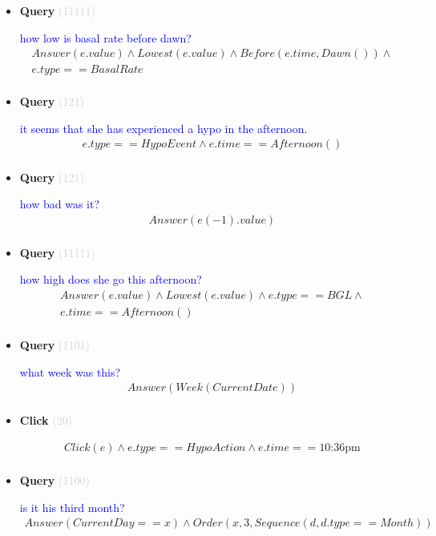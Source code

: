 \documentclass[11pt]{article}
\newcommand{\key}[1]{\textcolor{lightgray}{#1}}
\newcounter{CQuery}
\newcounter{CClick}
\begin{document}
\begin{itemize}
\item
\textbf{Query\theCQuery} \key{(11111)} \addtocounter{CQuery}{1}
\textcolor{blue}{ how low is basal rate before dawn? }
\begin{multline*}
Answer(e.value) \wedge Lowest(e.value) \wedge Before(e.time, Dawn()) \wedge \\ 
e.type==BasalRate \\ 
\end{multline*}


\item
\textbf{Query\theCQuery} \key{(121)} \addtocounter{CQuery}{1}
\textcolor{blue}{ it seems that she has experienced a hypo in the afternoon. }
\begin{multline*}
e.type==HypoEvent \wedge e.time==Afternoon() \\ 
\end{multline*}


\item
\textbf{Query\theCQuery} \key{(121)} \addtocounter{CQuery}{1}
\textcolor{blue}{ how bad was it? }
\begin{multline*}
Answer(e(-1).value) \\ 
\end{multline*}


\item
\textbf{Query\theCQuery} \key{(11111)} \addtocounter{CQuery}{1}
\textcolor{blue}{ how high does she go this afternoon? }
\begin{multline*}
Answer(e.value) \wedge Lowest(e.value) \wedge e.type==BGL \wedge \\ 
e.time==Afternoon() \\ 
\end{multline*}


\item
\textbf{Query\theCQuery} \key{(1101)} \addtocounter{CQuery}{1}
\textcolor{blue}{ what week was this? }
\begin{multline*}
Answer(Week(CurrentDate)) \\ 
\end{multline*}


\item
\textbf{Click\theCClick} \key{(20)} \addtocounter{CClick}{1}
\textcolor{blue}{  }
\begin{multline*}
Click(e) \wedge e.type==HypoAction \wedge e.time==\mbox{10:36pm} \\ 
\end{multline*}


\item
\textbf{Query\theCQuery} \key{(1100)} \addtocounter{CQuery}{1}
\textcolor{blue}{ is it his third month? }
\begin{multline*}
Answer(CurrentDay==x) \wedge Order(x, 3, Sequence(d, d.type==Month)) \\ 
\end{multline*}



\end{itemize}
\end{document}
